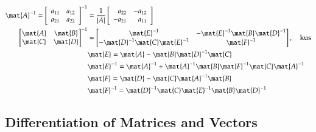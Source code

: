 \documentclass[a4paper]{article}
\numberwithin{equation}{subsection}
\begin{document}
\begin{align}
 \mat{A}^{-1} = \left[
 \begin{array}{rr}
 a_{11} & a_{12}\\
 a_{21} & a_{22}
 \end{array}
 \right]^{-1} & =
 \frac{1}{|A|} \left[
 \begin{array}{rr}
  a_{22}        & -a_{12}\\
 -a_{21}        & a_{11}
 \end{array}
 \right] \\
%
\begin{bmatrix}
\mat{A}      & \mat{B} \\
\mat{C}      & \mat{D}
\end{bmatrix}^{-1} &=
\begin{bmatrix}
\mat{E}^{-1}                      & -\mat{E}^{-1}\mat{B}\mat{D}^{-1} \\
-\mat{D}^{-1}\mat{C}\mat{E}^{-1}  & \mat{F}^{-1}
\end{bmatrix}, \quad\mbox{kus} \\
&\mat{E}        = \mat{A} - \mat{B}\mat{D}^{-1}\mat{C} \notag\\
&\mat{E}^{-1}   = \mat{A}^{-1} + \mat{A}^{-1}\mat{B}\mat{F}^{-1} \mat{C} \mat{A}^{-1} \notag\\
&\mat{F}             = \mat{D} - \mat{C} \mat{A}^{-1} \mat{B} \notag\\
&\mat{F}^{-1}        = \mat{D}^{-1} \mat{C} \mat{E}^{-1} \mat{B} \mat{D}^{-1} \notag\\
\end{align}


\subsection{Differentiation of Matrices and Vectors}
\end{document}
